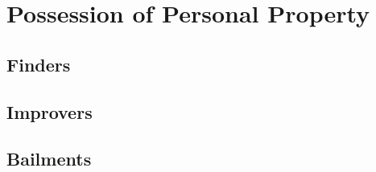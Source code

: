 \chapter{Possession of Personal Property}



\section{Finders}





\begin{questions}

\end{questions}





\begin{questions}

\end{questions}


\section{Improvers}





\begin{questions}

\end{questions}


\section{Bailments}





\begin{questions}

\end{questions}


